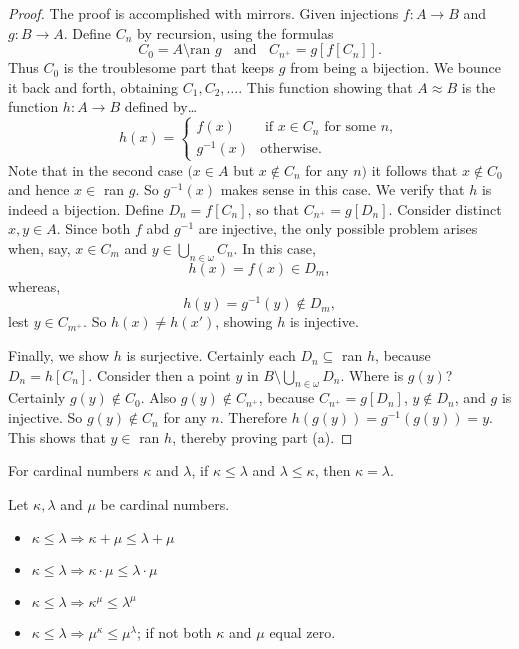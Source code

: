 \begin{proof}
The proof is accomplished with mirrors. Given injections $f : A \rightarrow B$ and $g: B \rightarrow A$. Define $C_n$ by recursion, using the formulas
$$C_0 = A \setminus \textrm{ran } g \; \; \textrm{ and } \; \; C_{n^+} = g[f[C_n]].$$
Thus $C_0$ is the troublesome part that keeps $g$ from being a bijection. We bounce it back and forth, obtaining $C_1, C_2, \dots$. This function showing that $A \approx B$ is the function $h: A \rightarrow B$ defined by\dots
\[
	h(x) = \begin{cases}
				f(x) & \textrm{ if } x\in C_n \textrm{ for some } n,\\
				g^{-1}(x) & \textrm{otherwise.}
		   \end{cases}
\]
Note that in the second case $(x \in A$ but $x \not\in C_n$ for any $n)$ it follows that $x \not \in C_0$ and hence $x \in$ ran $g$. So $g^{-1}(x)$ makes sense in this case.
We verify that $h$ is indeed a bijection. Define $D_n = f[C_n]$, so that $C_{n^+} = g[D_n]$. Consider distinct $x,y \in A$. Since both $f$ abd $g^{-1}$ are injective, the only possible problem arises when, say, $x \in C_m$
and $y \in \bigcup_{n \in \omega} C_n$. In this case,
$$h(x) = f(x) \in D_m,$$
whereas,
$$h(y) = g^{-1}(y) \not \in D_m,$$
lest $y \in C_{m^+}$. So $h(x) \neq h(x')$, showing $h$ is injective.

Finally, we show $h$ is surjective. Certainly each $D_n \subseteq$ ran $h$, because $D_n = h[C_n]$. Consider then a point $y$ in $B \setminus \bigcup_{n \in \omega} D_n$. Where is $g(y)$? Certainly $g(y) \not\in C_0$. Also $g(y) \not\in C_{n^+}$,
because $C_{n^+} = g[D_n]$, $y \not\in  D_n$, and $g$ is injective. So $g(y) \not\in C_n$ for any $n$. Therefore $h(g(y))=g^{-1}(g(y)) = y.$ This shows that $y \in$ ran $h$, thereby proving part (a).
\end{proof}

\begin{theorem}
For cardinal numbers $\kappa$ and $\lambda$, if $\kappa \leq \lambda$ and $\lambda \leq \kappa$, then $\kappa = \lambda$.
\end{theorem}

\begin{proposition}
Let $\kappa, \lambda$ and $\mu$ be cardinal numbers.
\begin{itemize}
  \item $\kappa \leq \lambda \Rightarrow \kappa + \mu \leq \lambda + \mu$
  \item $\kappa \leq \lambda \Rightarrow \kappa \cdot \mu \leq \lambda \cdot \mu$
  \item $\kappa \leq \lambda \Rightarrow \kappa^{\mu} \leq \lambda^{\mu}$
  \item $\kappa \leq \lambda \Rightarrow \mu^{\kappa} \leq \mu^{\lambda}$;	if not both $\kappa$ and $\mu$ equal zero.
\end{itemize}
\end{proposition}

